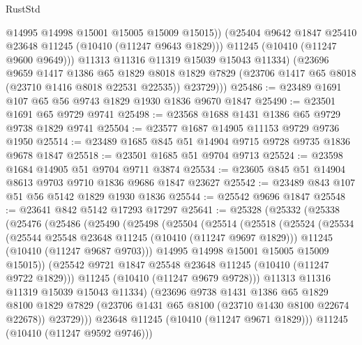 \begin{lexlean}{RustStd}
\begin{coremodule}
                @14995
                @14998
                @15001
                @15005
                @15009
                @15015))
            (@25404 @9642 @1847 @25410 @23648 @11245 (@10410 (@11247 @9643 @1829)))
            @11245
            (@10410 (@11247 @9600 @9649)))
          @11313
          @11316
          @11319
          @15039
          @15043
          @11334)
        (@23696
          @9659
          @1417
          @1386
          @65
          @1829
          @8018
          @1829
          @7829
          (@23706 @1417 @65 @8018 (@23710 @1416 @8018 @22531 @22535))
          @23729)))
@25486 := @23489 @1691 @107 @65 @56 @9743 @1829 @1930 @1836 @9670 @1847
@25490 := @23501 @1691 @65 @9729 @9741
@25498 := @23568 @1688 @1431 @1386 @65 @9729 @9738 @1829 @9741
@25504 := @23577 @1687 @14905 @11153 @9729 @9736 @1950
@25514 := @23489 @1685 @845 @51 @14904 @9715 @9728 @9735 @1836 @9678 @1847
@25518 := @23501 @1685 @51 @9704 @9713
@25524 := @23598 @1684 @14905 @51 @9704 @9711 @3874
@25534 := @23605 @845 @51 @14904 @8613 @9703 @9710 @1836 @9686 @1847 @23627
@25542 := @23489 @843 @107 @51 @56 @5142 @1829 @1930 @1836
@25544 := @25542 @9696 @1847
@25548 := @23641 @842 @5142 @17293 @17297
@25641 := @25328
    (@25332
      (@25338
        (@25476
          (@25486
            (@25490
              (@25498
                (@25504
                  (@25514
                    (@25518
                      (@25524
                        (@25534
                          (@25544 @25548 @23648 @11245 (@10410 (@11247 @9697 @1829)))
                          @11245
                          (@10410 (@11247 @9687 @9703)))
                        @14995
                        @14998
                        @15001
                        @15005
                        @15009
                        @15015))
                    (@25542 @9721 @1847 @25548 @23648 @11245 (@10410 (@11247 @9722 @1829)))
                    @11245
                    (@10410 (@11247 @9679 @9728)))
                  @11313
                  @11316
                  @11319
                  @15039
                  @15043
                  @11334)
                (@23696
                  @9738
                  @1431
                  @1386
                  @65
                  @1829
                  @8100
                  @1829
                  @7829
                  (@23706 @1431 @65 @8100 (@23710 @1430 @8100 @22674 @22678))
                  @23729)))
            @23648
            @11245
            (@10410 (@11247 @9671 @1829)))
          @11245
          (@10410 (@11247 @9592 @9746)))

\end{coremodule}
\end{lexlean}
